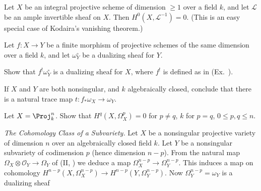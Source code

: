 {\Exercises
{\fontsize{9}{10.5}\selectfont\setlength{\parskip}{0pt}
\begin{description}[style=multiline,labelwidth=2.55em,leftmargin=2.85em,itemsep=4pt,topsep=0pt,parsep=0pt]
\item[\hypertarget{ex-III-7.1}{}7.1.] Let $X$ be an integral projective scheme of dimension $\ge1$ over a field $k$, and let $\mathcal L$ be an ample invertible sheaf on $X$. Then $H^0(X,\mathcal L^{-1})=0$. (This is an easy special case of Kodaira's vanishing theorem.)
\item[\hypertarget{ex-III-7.2}{}7.2.] Let $f\colon X\to Y$ be a finite morphism of projective schemes of the same dimension over a field $k$, and let $\omega_Y^\circ$ be a dualizing sheaf for $Y$.
\begin{parts}
\item Show that $f^!\omega_Y^\circ$ is a dualizing sheaf for $X$, where $f^!$ is defined as in (Ex.~).
\item If $X$ and $Y$ are both nonsingular, and $k$ algebraically closed, conclude that there is a natural trace map $t\colon f_*\omega_X\to\omega_Y$.
\end{parts}
\item[\hypertarget{ex-III-7.3}{}7.3.] Let $X=\Proj_k^n$. Show that $H^q(X,\Omega_X^p)=0$ for $p\ne q$, $k$ for $p=q$, $0\le p,q\le n$.
\item[\hypertarget{ex-III-7.4}{}*7.4.] \emph{The Cohomology Class of a Subvariety.} Let $X$ be a nonsingular projective variety of dimension $n$ over an algebraically closed field $k$. Let $Y$ be a nonsingular subvariety of codimension $p$ (hence dimension $n-p$). From the natural map $\Omega_X\otimes\mathcal O_Y\to\Omega_Y$ of (II, ) we deduce a map $\Omega_X^{n-p}\to\Omega_Y^{n-p}$. This induces a map on cohomology $H^{n-p}(X,\Omega_X^{n-p})\to H^{n-p}(Y,\Omega_Y^{n-p})$. Now $\Omega_Y^{n-p}=\omega_Y$ is a dualizing sheaf
\end{description}
}
}
